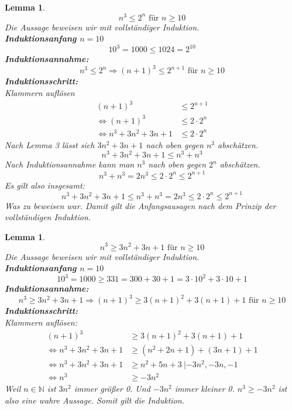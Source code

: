 \documentclass[11pt]{article}
\begin{document}
    \newtheorem{lemma2}[lemma_counter]{Lemma}
    \begin{lemma2}
        \[ n^3 \leq 2^n \text{ für } n \geq 10 \]
        Die Aussage beweisen wir mit vollständiger Induktion. \\
        \textbf{Induktionsanfang \(n=10\)}
        \[10^3 = 1000 \leq 1024 = 2^{10} \]
        \textbf{Induktionsannahme:}
        \[ n^3 \leq 2^n \Rightarrow {(n+1)}^3 \leq 2^{ n+1 } \text{ für } n \geq 10 \]
        \textbf{Induktionsschritt:} \\
        Klammern auflösen
        \begin{align*}
            {(n+1)}^3 & \leq 2^{ n+1 } \\
            \Leftrightarrow {(n+1)}^3 & \leq 2 \cdot 2^n \\
            \Leftrightarrow n^3 + 3n^2 + 3n + 1 & \leq 2 \cdot 2^n
        \end{align*} 
        Nach Lemma 3 lässt sich \(3n^2 + 3n + 1\) nach oben gegen \(n^3\) abschätzen.
        \[ n^3 + 3n^2 + 3n + 1 \leq n^3 + n^3 \]
        Nach Induktionsannahme kann man \(n^3\) nach oben gegen \(2^n\) abschätzen.
        \[ n^3 + n^3 = 2 n^3 \leq 2 \cdot 2^n \leq 2^{n+1} \]
        Es gilt also insgesamt:
        \[n^3 + 3n^2 + 3n + 1 \leq n^3 + n^3 = 2 n^3 \leq 2 \cdot 2^n \leq 2^{n+1} \]
        Was zu beweisen war. Damit gilt die Anfangsausagen nach dem Prinzip der vollständigen Induktion.
    \end{lemma2}

    \newtheorem{lemma3}[lemma_counter]{Lemma}
    \begin{lemma3}
        \[n^3 \geq 3n^2 + 3n + 1 \text{ für } n \geq 10 \]
        Die Aussage beweisen wir mit vollständiger Induktion. \\
        \textbf{Induktionsanfang \(n=10\)}
        \[10^3 = 1000 \geq 331 = 300 + 30 + 1 = 3 \cdot 10^2 + 3 \cdot 10 + 1\]
        \textbf{Induktionsannahme:}
        \[ n^3 \geq 3n^2 + 3n + 1 \Rightarrow {(n+1)}^3 \geq 3{(n+1)}^2 + 3(n+1) + 1 \text{ für } n \geq 10 \]
        \textbf{Induktionsschritt:} \\
        Klammern auflösen:
        \begin{align*}
            {(n+1)}^3 & \geq 3{(n+1)}^2 + 3(n+1) + 1 \\
            \Leftrightarrow n^3 + 3n^2 + 3n + 1 & \geq (n^2 + 2n + 1) + (3n + 1) + 1 \\
            \Leftrightarrow n^3 + 3n^2 + 3n + 1 & \geq n^2 + 5n + 3 \: | -3n^2, -3n, -1 \\
            \Leftrightarrow n^3 & \geq -3n^2
        \end{align*}
        Weil \(n \in \mathbb{N}\) ist \(3n^2\) immer größer 0. Und \(-3n^2\) immer kleiner 0.
        \(n^3 \geq -3n^2\) ist also eine wahre Aussage. Somit gilt die Induktion.
    \end{lemma3}
\end{document}
